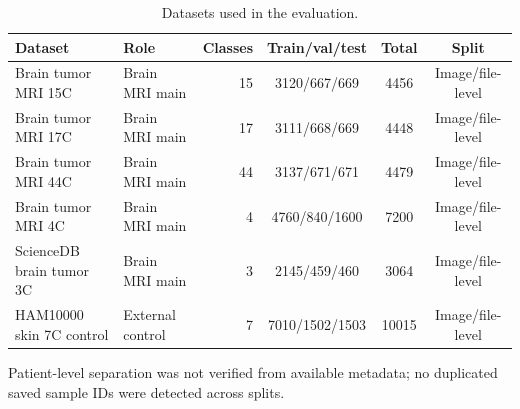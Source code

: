\begin{table}[t]
\caption{Datasets used in the evaluation.}
\label{tab:datasets}
\centering
\footnotesize
\setlength{\tabcolsep}{5pt}
\begin{tabular}{llrccc}
\toprule
Dataset & Role & Classes & Train/val/test & Total & Split \\
\midrule
Brain tumor MRI 15C & Brain MRI main & 15 & 3120/667/669 & 4456 & Image/file-level \\
Brain tumor MRI 17C & Brain MRI main & 17 & 3111/668/669 & 4448 & Image/file-level \\
Brain tumor MRI 44C & Brain MRI main & 44 & 3137/671/671 & 4479 & Image/file-level \\
Brain tumor MRI 4C & Brain MRI main & 4 & 4760/840/1600 & 7200 & Image/file-level \\
ScienceDB brain tumor 3C & Brain MRI main & 3 & 2145/459/460 & 3064 & Image/file-level \\
HAM10000 skin 7C control & External control & 7 & 7010/1502/1503 & 10015 & Image/file-level \\
\bottomrule
\end{tabular}
\par\vspace{2pt}
\footnotesize Patient-level separation was not verified from available metadata; no duplicated saved sample IDs were detected across splits.
\end{table}

